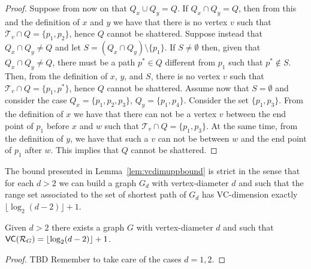 \begin{proof}
  Suppose from now on that $Q_x\cup Q_y=Q$.
  If $Q_x\cap Q_y=Q$, then from this and the definition of $x$ and $y$ we have
  that there is no vertex $v$ such that $\mathcal{T}_v\cap Q=\{p_1,p_2\}$, hence
  $Q$ cannot be shattered. Suppose instead that $Q_x\cap Q_y\neq Q$ and let
  $S=(Q_x\cap Q_y)\setminus\{p_1\}$. If $S\neq\emptyset$ then, given that
  $Q_x\cap Q_y\neq Q$, there must be a path $p^*\in Q$ different from $p_1$ such
  that $p^*\notin S$. Then, from the definition of $x$, $y$, and $S$, there is no
  vertex $v$ such that $\mathcal{T}_v\cap Q=\{p_1,p^*\}$, hence $Q$ cannot be
  shattered. Assume now that $S=\emptyset$ and consider the case
  $Q_x=\{p_1,p_2,p_3\}$, $Q_y=\{p_1,p_4\}$. Consider the set $\{p_1,p_3\}$. From
  the definition of $x$ we have that there can not be a vertex $v$ between the
  end point of $p_1$ before $x$ and $w$ such that $\mathcal{T}_v\cap
  Q=\{p_1,p_3\}$. At the same time, from the definition of $y$, we have that
  such a $v$ can not be between $w$ and the end point of $p_1$ after $w$. This
  implies that $Q$ cannot be shattered.

\end{proof}

The bound presented in Lemma~\ref{lem:vcdimuppbound} is strict in the sense that
for each $d>2$ we can build a graph $G_d$ with vertex-diameter $d$ and such
that the range set associated to the set of shortest path of $G_d$ has
VC-dimension exactly $\lfloor\log_2(d-2)\rfloor+1$.

\begin{lemma}
  Given $d>2$ there exists a graph $G$ with vertex-diameter $d$ and such that
  $\mathsf{VC}(\mathcal{R}_G)=\lfloor\log_2(d-2)\rfloor+1$.
\end{lemma}

\begin{proof}
  \XXX TBD Remember to take care of the cases $d=1,2$.
\end{proof}

